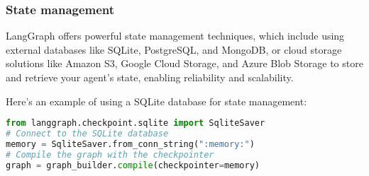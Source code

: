 \begin{frame}[fragile]\frametitle{State management}

LangGraph offers powerful state management techniques, which include using external databases like SQLite, PostgreSQL, and MongoDB, or cloud storage solutions like Amazon S3, Google Cloud Storage, and Azure Blob Storage to store and retrieve your agent's state, enabling reliability and scalability.

Here's an example of using a SQLite database for state management:

      \begin{lstlisting}[language=Python, basicstyle=\tiny]
from langgraph.checkpoint.sqlite import SqliteSaver
# Connect to the SQLite database
memory = SqliteSaver.from_conn_string(":memory:")
# Compile the graph with the checkpointer
graph = graph_builder.compile(checkpointer=memory)
      \end{lstlisting}
\end{frame}

